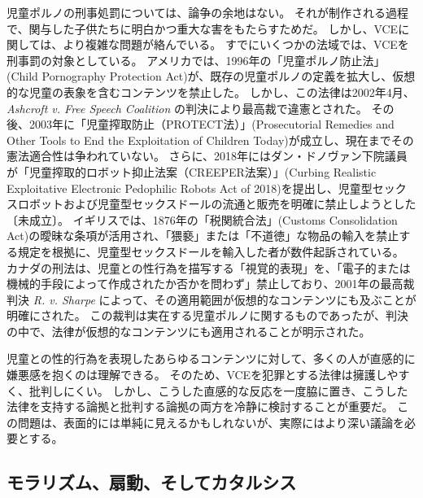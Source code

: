\documentclass[paper=a4,book,openany]{jlreq}
\begin{document}
児童ポルノの刑事処罰については、論争の余地はない。
それが制作される過程で、関与した子供たちに明白かつ重大な害をもたらすためだ。
しかし、VCEに関しては、より複雑な問題が絡んでいる。
すでにいくつかの法域では、VCEを刑事罰の対象としている。
アメリカでは、1996年の「児童ポルノ防止法」(Child Pornography Protection Act)が、既存の児童ポルノの定義を拡大し、仮想的な児童の表象を含むコンテンツを禁止した。
しかし、この法律は2002年4月、\emph{Ashcroft v. Free Speech Coalition} の判決により最高裁で違憲とされた。
その後、2003年に「児童搾取防止（PROTECT法）」(Prosecutorial Remedies and Other Tools to End the Exploitation of Children Today)が成立し、現在までその憲法適合性は争われていない。
さらに、2018年にはダン・ドノヴァン下院議員が「児童搾取的ロボット抑止法案（CREEPER法案）」(Curbing Realistic Exploitative Electronic Pedophilic Robots Act of 2018)を提出し、児童型セックスロボットおよび児童型セックスドールの流通と販売を明確に禁止しようとした〔未成立〕。
イギリスでは、1876年の「税関統合法」(Customs Consolidation Act)の曖昧な条項が活用され、「猥褻」または「不道徳」な物品の輸入を禁止する規定を根拠に、児童型セックスドールを輸入した者が数件起訴されている。
カナダの刑法は、児童との性行為を描写する「視覚的表現」を、「電子的または機械的手段によって作成されたか否かを問わず」禁止しており、2001年の最高裁判決 \emph{R. v. Sharpe} によって、その適用範囲が仮想的なコンテンツにも及ぶことが明確にされた。
この裁判は実在する児童ポルノに関するものであったが、判決の中で、法律が仮想的なコンテンツにも適用されることが明示された。

児童との性的行為を表現したあらゆるコンテンツに対して、多くの人が直感的に嫌悪感を抱くのは理解できる。
そのため、VCEを犯罪とする法律は擁護しやすく、批判しにくい。
しかし、こうした直感的な反応を一度脇に置き、こうした法律を支持する論拠と批判する論拠の両方を冷静に検討することが重要だ。
この問題は、表面的には単純に見えるかもしれないが、実際にはより深い議論を必要とする。

\subsection{モラリズム、扇動、そしてカタルシス}
\end{document}
